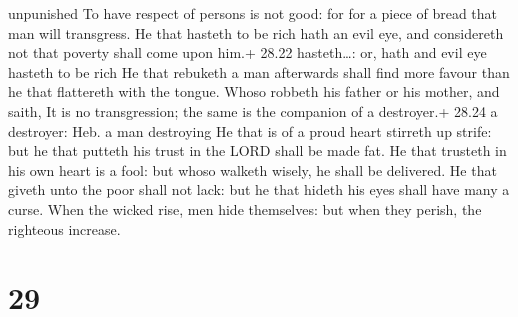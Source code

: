unpunished  To have respect of persons is not good: for for
a piece of bread that man will transgress.  He that hasteth
to be rich hath an evil eye, and considereth not that poverty shall come
upon him.+ 28.22 hasteth\ldots: or, hath and evil eye hasteth to be rich
 He that rebuketh a man afterwards shall find more favour
than he that flattereth with the tongue.  Whoso robbeth his
father or his mother, and saith, It is no transgression; the same is the
companion of a destroyer.+ 28.24 a destroyer: Heb. a man destroying
 He that is of a proud heart stirreth up strife: but he
that putteth his trust in the LORD shall be made fat.  He
that trusteth in his own heart is a fool: but whoso walketh wisely, he
shall be delivered.  He that giveth unto the poor shall not
lack: but he that hideth his eyes shall have many a curse. 
When the wicked rise, men hide themselves: but when they perish, the
righteous increase.

\hypertarget{section-28}{%
\section{29}\label{section-28}}

